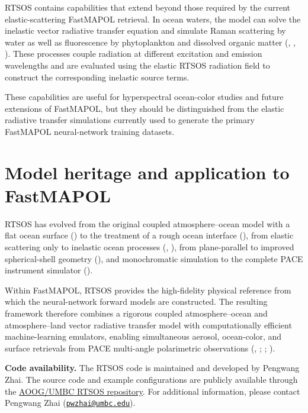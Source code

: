 \documentclass[
  11pt,
  letterpaper,
]{scrreprt}
\begin{document}
RTSOS contains capabilities that extend beyond those required by the
current elastic-scattering FastMAPOL retrieval. In ocean waters, the
model can solve the inelastic vector radiative transfer equation and
simulate Raman scattering by water as well as fluorescence by
phytoplankton and dissolved organic matter
(,
, ).
These processes couple radiation at different excitation and emission
wavelengths and are evaluated using the elastic RTSOS radiation field to
construct the corresponding inelastic source terms.

These capabilities are useful for hyperspectral ocean-color studies and
future extensions of FastMAPOL, but they should be distinguished from
the elastic radiative transfer simulations currently used to generate
the primary FastMAPOL neural-network training datasets.

\section{Model heritage and application to
FastMAPOL}\label{model-heritage-and-application-to-fastmapol}

RTSOS has evolved from the original coupled atmosphere--ocean model with
a flat ocean surface () to
the treatment of a rough ocean interface
(), from elastic scattering
only to inelastic ocean processes (, ), from plane-parallel to
improved spherical-shell geometry (), and monochromatic simulation to the complete PACE instrument
simulator ().

Within FastMAPOL, RTSOS provides the high-fidelity physical reference
from which the neural-network forward models are constructed. The
resulting framework therefore combines a rigorous coupled
atmosphere--ocean and atmosphere--land vector radiative transfer model
with computationally efficient machine-learning emulators, enabling
simultaneous aerosol, ocean-color, and surface retrievals from PACE
multi-angle polarimetric observations (, ;
;
).

\textbf{Code availability.} The RTSOS code is maintained and developed
by Pengwang Zhai. The source code and example configurations are
publicly available through the
\href{https://github.com/aoog-umbc/rtsos-public}{AOOG/UMBC RTSOS
repository}. For additional information, please contact Pengwang Zhai
(\href{mailto:pwzhai@umbc.edu}{\nolinkurl{pwzhai@umbc.edu}}).
\end{document}
